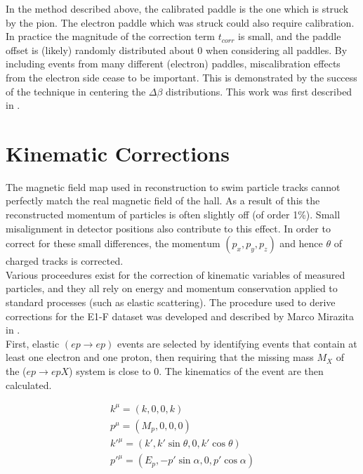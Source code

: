In the method described above, the calibrated paddle is the one which is struck by the pion.  The electron paddle which was struck could also require calibration.  In practice the magnitude of the correction term $t_{corr}$ is small, and the paddle offset is (likely) randomly distributed about 0 when considering all paddles.  By including events from many different (electron) paddles, miscalibration effects from the electron side cease to be important.  This is demonstrated by the success of the technique in centering the $\Delta \beta$ distributions.  This work was first described in \cite{theses-harrison:2015}. \\

\section{Kinematic Corrections}
The magnetic field map used in reconstruction to swim particle tracks cannot perfectly match the real magnetic field of the hall.  As a result of this the reconstructed momentum of particles is often slightly off (of order 1\%).  Small misalignment in detector positions also contribute to this effect.  In order to correct for these small differences, the momentum $(p_x, p_y, p_z)$ and hence $\theta$ of charged tracks is corrected. \\

Various proceedures exist for the correction of kinematic variables of measured particles, and they all rely on energy and momentum conservation applied to standard processes (such as elastic scattering).  The procedure used to derive corrections for the E1-F dataset was developed and described by Marco Mirazita in \cite{misc-mirazita:2010}.  \\

First, elastic $(ep \rightarrow ep)$ events are selected by identifying events that contain at least one electron and one proton, then requiring that the missing mass $M_X$ of the ($ep \rightarrow epX$) system is close to 0.  The kinematics of the event are then calculated.

\begin{gather}
	k^{\mu} = (k, 0, 0, k)                         \\
	p^{\mu} = (M_{p}, 0, 0, 0)                     \\
	k'^{\mu} = (k', k'\sin\theta, 0, k'\cos\theta) \\
	p'^{\mu} = (E_{p}, -p'\sin\alpha, 0, p'\cos\alpha) 
\end{gather}

